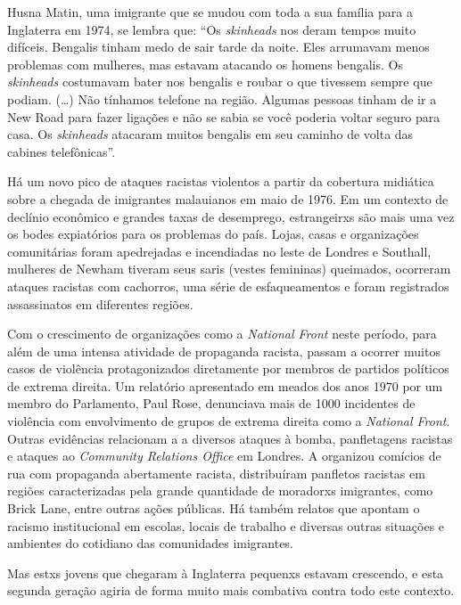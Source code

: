 Husna Matin, uma imigrante que se mudou com toda a sua família para a Inglaterra em 1974, se lembra que: ``Os \emph{skinheads} nos deram tempos muito difíceis. Bengalis tinham medo de sair tarde da noite. Eles arrumavam menos problemas com mulheres, mas estavam atacando os homens bengalis. Os \emph{skinheads} costumavam bater nos bengalis e roubar o que tivessem sempre que podiam. (\ldots{}) Não tínhamos telefone na região. Algumas pessoas tinham de ir a New Road para fazer ligações e não se sabia se você poderia voltar seguro para casa. Os \emph{skinheads} atacaram muitos bengalis em seu caminho de volta das cabines telefônicas''.

Há um novo pico de ataques racistas violentos a partir da cobertura midiática sobre a chegada de imigrantes malauianos em maio de 1976. Em um contexto de declínio econômico e grandes taxas de desemprego, estrangeirxs são mais uma vez os bodes expiatórios para os problemas do país. Lojas, casas e organizações comunitárias foram apedrejadas e incendiadas no leste de Londres e Southall, mulheres de Newham tiveram seus saris (vestes femininas) queimados, ocorreram ataques racistas com cachorros, uma série de esfaqueamentos e foram registrados assassinatos em diferentes regiões.

Com o crescimento de organizações como a \emph{National Front} neste período, para além de uma intensa atividade de propaganda racista, passam a ocorrer muitos casos de violência protagonizados diretamente por membros de partidos políticos de extrema direita. Um relatório apresentado em meados dos anos 1970 por um membro do Parlamento, Paul Rose, denunciava mais de 1000 incidentes de violência com envolvimento de grupos de extrema direita como a \emph{National Front}. Outras evidências relacionam a  a diversos ataques à bomba, panfletagens racistas e ataques ao \emph{Community Relations Office} em Londres. A  organizou comícios de rua com propaganda abertamente racista, distribuíram panfletos racistas em regiões caracterizadas pela grande quantidade de moradorxs imigrantes, como Brick Lane, entre outras ações públicas. Há também relatos que apontam o racismo institucional em escolas, locais de trabalho e diversas outras situações e ambientes do cotidiano das comunidades imigrantes.

Mas estxs jovens que chegaram à Inglaterra pequenxs estavam crescendo, e esta segunda geração agiria de forma muito mais combativa contra todo este contexto.

